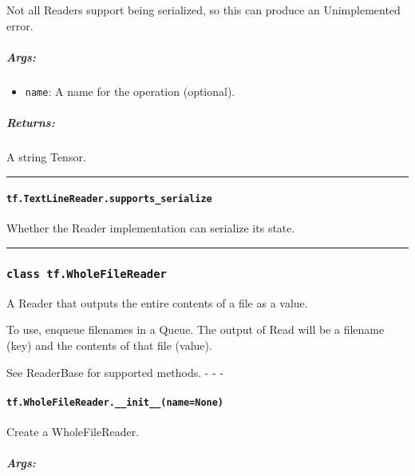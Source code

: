 Not all Readers support being serialized, so this can produce an
Unimplemented error.

\subparagraph{Args: }\label{args-14}

\begin{itemize}
\tightlist
\item
  \texttt{name}: A name for the operation (optional).
\end{itemize}

\subparagraph{Returns: }\label{returns-12}

A string Tensor.

\begin{center}\rule{0.5\linewidth}{\linethickness}\end{center}

\paragraph{\texorpdfstring{\texttt{tf.TextLineReader.supports\_serialize}
}{tf.TextLineReader.supports\_serialize }}\label{tf.textlinereader.supportsux5fserialize}

Whether the Reader implementation can serialize its state.

\begin{center}\rule{0.5\linewidth}{\linethickness}\end{center}

\subsubsection{\texorpdfstring{\texttt{class\ tf.WholeFileReader}
}{class tf.WholeFileReader }}\label{class-tf.wholefilereader}

A Reader that outputs the entire contents of a file as a value.

To use, enqueue filenames in a Queue. The output of Read will be a
filename (key) and the contents of that file (value).

See ReaderBase for supported methods. - - -

\paragraph{\texorpdfstring{\texttt{tf.WholeFileReader.\_\_init\_\_(name=None)}
}{tf.WholeFileReader.\_\_init\_\_(name=None) }}\label{tf.wholefilereader.ux5fux5finitux5fux5fnamenone}

Create a WholeFileReader.

\subparagraph{Args: }\label{args-15}

